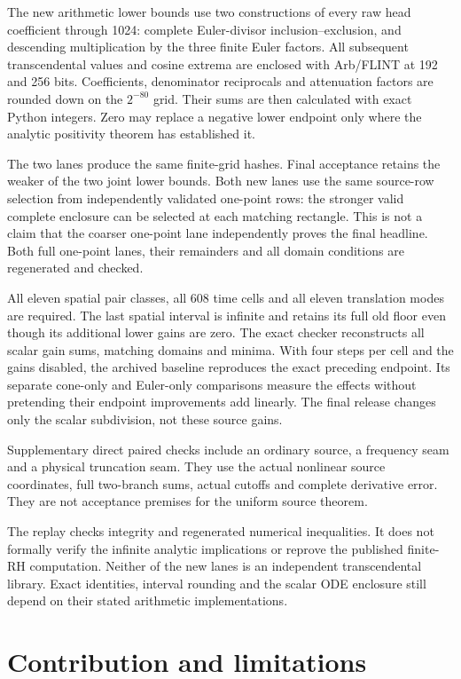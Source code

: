 \documentclass[11pt,a4paper]{article}
\begin{document}
The new arithmetic lower bounds use two constructions of every raw head
coefficient through 1024: complete Euler-divisor inclusion--exclusion, and
descending multiplication by the three finite Euler factors. All subsequent
transcendental values and cosine extrema are enclosed with Arb/FLINT\cite{arb} at
192 and 256 bits. Coefficients, denominator reciprocals and attenuation
factors are rounded down on the \(2^{-80}\) grid. Their sums are then
calculated with exact Python integers. Zero may replace a negative lower
endpoint only where the analytic positivity theorem has established it.

The two lanes produce the same finite-grid hashes. Final acceptance retains
the weaker of the two joint lower bounds. Both new lanes use the same
source-row selection from independently validated one-point rows: the stronger
valid complete enclosure can be selected at each matching rectangle. This
is not a claim that the coarser one-point lane independently proves the final
headline. Both full one-point lanes, their remainders and all domain conditions
are regenerated and checked.

All eleven spatial pair classes, all 608 time cells and all eleven translation
modes are required. The last spatial interval is infinite and retains its
full old floor even though its additional lower gains are zero. The exact
checker reconstructs all scalar gain sums, matching domains and minima.
With four steps per cell and the gains disabled, the archived baseline reproduces
the exact preceding endpoint. Its separate cone-only and Euler-only comparisons
measure the effects without pretending their endpoint improvements add linearly.
The final release changes only the scalar subdivision, not these source gains.

Supplementary direct paired checks include an ordinary source, a frequency
seam and a physical truncation seam. They use the actual nonlinear source
coordinates, full two-branch sums, actual cutoffs and complete derivative
error. They are not acceptance premises for the uniform source theorem.

The replay checks integrity and regenerated numerical inequalities. It does
not formally verify the infinite analytic implications or reprove the
published finite-RH computation. Neither of the new lanes is an independent
transcendental library. Exact identities, interval rounding and the scalar
ODE enclosure still depend on their stated arithmetic implementations.

\section{Contribution and limitations}\label{what-is-new-and-what-is-not-claimed}
\end{document}
